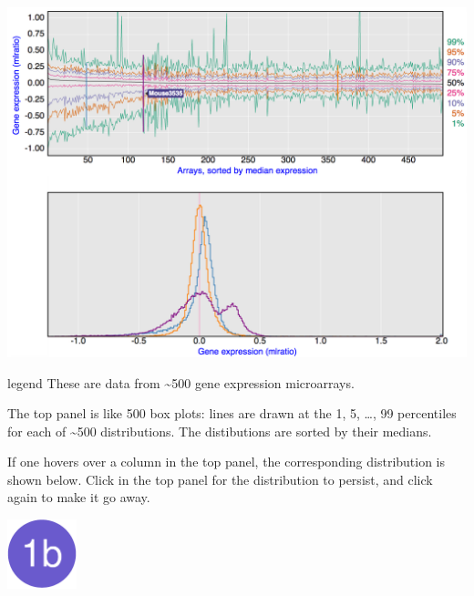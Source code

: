 \documentclass[final,plain]{beamer}
\newlength{\onecolwid}
\newlength{\twocolwid}
\newcommand{\colthreevsep}{\vspace{14mm}}
\begin{document}
\begin{frame}[t]
\begin{columns}[t]
\begin{column}{\twocolwid}
\begin{columns}[t]
\begin{column}{\onecolwid}
        \centerline{\href{http://www.biostat.wisc.edu/~kbroman/posters/ENAR2014/1a}{\includegraphics[width=\onecolwid]{Figs/1a.png}}}

      \vspace{10mm} %

        \begin{beamercolorbox}[sep=1em, wd=\onecolwid]{legend} \rmfamily
           These are data from {\textasciitilde}500 gene expression
           microarrays. 

           \vspace{12pt}

           The top panel is like 500 box plots:
           lines are drawn at the 1, 5, \dots, 99 percentiles
           for each of {\textasciitilde}500 distributions. The
           distibutions are sorted by their medians.

           \vspace{12pt}

           If one hovers over a column in the top panel, the corresponding distribution
          is shown below. Click in the top panel for the distribution
          to persist, and click again to make it go away.
        \end{beamercolorbox}


    \colthreevsep %

        \href{http://www.biostat.wisc.edu/~kbroman/posters/ENAR2014/1b}{\includegraphics[width=2cm]{Figs/dot1b.pdf}}


\end{column}
\end{columns}
\end{column}
\end{columns}
\end{frame}
\end{document}
